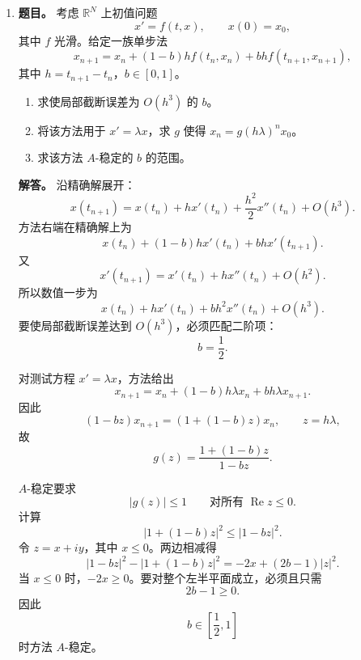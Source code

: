 ﻿\documentclass[UTF8,12pt]{ctexart}
\begin{document}
\begin{enumerate}[label=\textbf{\arabic*.},leftmargin=2.2em]
对 BFGS 更新，需要证明两个分母非零。因为 \(B_k\) 正定，若 \(s_k\ne0\)，则
\[
\langle B_ks_k,s_k\rangle>0.
\]
另一方面，
\[
\langle y_k,s_k\rangle
=\langle \nabla J(u_{k+1})-\nabla J(u_k),u_{k+1}-u_k\rangle.
\]
由导数表达式，
\[
\langle y_k,s_k\rangle
=\int_\Omega |\nabla s_k|^2\,dx
+\int_\Omega\bigl(u_{k+1}^3-u_k^3\bigr)(u_{k+1}-u_k)\,dx.
\]
而对任意实数 \(a,b\)，
\[
(a^3-b^3)(a-b)=(a-b)^2(a^2+ab+b^2)\ge0.
\]
故
\[
\langle y_k,s_k\rangle\ge\|\nabla s_k\|^2.
\]
若 \(s_k\ne0\)，则 \(\|\nabla s_k\|>0\)，因此
\[
\langle y_k,s_k\rangle>0.
\]
两个分母均为正数，所以 BFGS 更新良定义。

\item \textbf{题目。} 考虑 \(\mathbb R^N\) 上初值问题
\[
x'=f(t,x),\qquad x(0)=x_0,
\]
其中 \(f\) 光滑。给定一族单步法
\[
x_{n+1}=x_n+(1-b)hf(t_n,x_n)+bhf(t_{n+1},x_{n+1}),
\]
其中 \(h=t_{n+1}-t_n\)，\(b\in[0,1]\)。
\begin{enumerate}[label=(\alph*),leftmargin=2.0em]
\item 求使局部截断误差为 \(O(h^3)\) 的 \(b\)。
\item 将该方法用于 \(x'=\lambda x\)，求 \(g\) 使得 \(x_n=g(h\lambda)^nx_0\)。
\item 求该方法 \(A\)-稳定的 \(b\) 的范围。
\end{enumerate}

\textbf{解答。} 沿精确解展开：
\[
x(t_{n+1})=x(t_n)+hx'(t_n)+\frac{h^2}{2}x''(t_n)+O(h^3).
\]
方法右端在精确解上为
\[
x(t_n)+(1-b)hx'(t_n)+bhx'(t_{n+1}).
\]
又
\[
x'(t_{n+1})=x'(t_n)+hx''(t_n)+O(h^2).
\]
所以数值一步为
\[
x(t_n)+hx'(t_n)+bh^2x''(t_n)+O(h^3).
\]
要使局部截断误差达到 \(O(h^3)\)，必须匹配二阶项：
\[
b=\frac12.
\]

对测试方程 \(x'=\lambda x\)，方法给出
\[
x_{n+1}=x_n+(1-b)h\lambda x_n+bh\lambda x_{n+1}.
\]
因此
\[
(1-bz)x_{n+1}=(1+(1-b)z)x_n,\qquad z=h\lambda,
\]
故
\[
g(z)=\frac{1+(1-b)z}{1-bz}.
\]

\(A\)-稳定要求
\[
|g(z)|\le1\qquad \text{对所有 }\operatorname{Re}z\le0.
\]
计算
\[
|1+(1-b)z|^2\le |1-bz|^2.
\]
令 \(z=x+iy\)，其中 \(x\le0\)。两边相减得
\[
|1-bz|^2-|1+(1-b)z|^2
=-2x+(2b-1)|z|^2.
\]
当 \(x\le0\) 时，\(-2x\ge0\)。要对整个左半平面成立，必须且只需
\[
2b-1\ge0.
\]
因此
\[
\boxed{b\in\left[\frac12,1\right]}
\]
时方法 \(A\)-稳定。


\end{enumerate}
\end{document}
